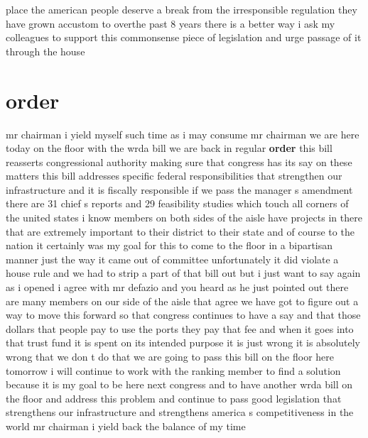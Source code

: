 \documentclass{article}
\begin{document}
place the american people deserve a break from the irresponsible regulation they have grown accustom to overthe past 8 years there is a better way i ask my colleagues to support this commonsense piece of legislation and urge passage of it through the house\pagebreak

\section*{order}
mr chairman i yield myself such time as i may consume mr chairman we are here today on the floor with the wrda bill we are back in regular {\bf \color{red} order} this bill reasserts congressional authority making sure that congress has its say on these matters this bill addresses specific federal responsibilities that strengthen our infrastructure and it is fiscally responsible if we pass the manager s amendment there are 31 chief s reports and 29 feasibility studies which touch all corners of the united states i know members on both sides of the aisle have projects in there that are extremely important to their district to their state and of course to the nation it certainly was my goal for this to come to the floor in a bipartisan manner just the way it came out of committee unfortunately it did violate a house rule and we had to strip a part of that bill out but i just want to say again as i opened i agree with mr defazio and you heard as he just pointed out there are many members on our side of the aisle that agree we have got to figure out a way to move this forward so that congress continues to have a say and that those dollars that people pay to use the ports they pay that fee and when it goes into that trust fund it is spent on its intended purpose it is just wrong it is absolutely wrong that we don t do that we are going to pass this bill on the floor here tomorrow i will continue to work with the ranking member to find a solution because it is my goal to be here next congress and to have another wrda bill on the floor and address this problem and continue to pass good legislation that strengthens our infrastructure and strengthens america s competitiveness in the world mr chairman i yield back the balance of my time
\vspace{8mm}
\end{document}

